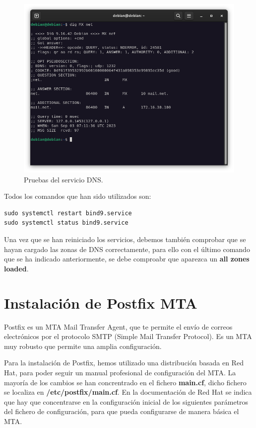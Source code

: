 \begin{figure}[H]
	\centering
	\includegraphics[scale=0.30]{01}
	\caption{Pruebas del servicio DNS.}
\end{figure}


Todos los comandos que han sido utilizados son:

\begin{lstlisting}[style=mybash]
sudo systemctl restart bind9.service
sudo systemctl status bind9.service
\end{lstlisting}

Una vez que se han reiniciado los servicios, debemos también comprobar que se hayan cargado las zonas de DNS correctamente, para ello con el último comando que se ha indicado anteriormente, se debe comproabr que aparezca un \textbf{all zones loaded}.

\section{Instalación de Postfix MTA}

Postfix es un MTA Mail Transfer Agent, que te permite el envío de correos electrónicos por el protocolo SMTP (Simple Mail Transfer Protocol). Es un MTA muy robusto que permite una amplia configuración.
\vspace{5mm}

Para la instalación de Postfix, hemos utilizado una distribución basada en Red Hat, para poder seguir un manual profesional de configuración del MTA. La mayoría de los cambios se han concrentrado en el fichero \textbf{main.cf}, dicho fichero se localiza en \textbf{/etc/postfix/main.cf}. En la documentación de Red Hat se indica que hay que concentrarse en la configuración inicial de los siguientes parámetros del fichero de configuración, para que pueda configurarse de manera básica el MTA.
\vspace{5mm}

